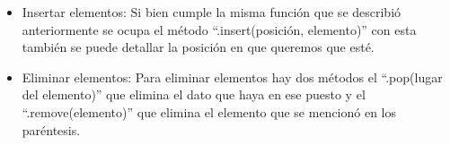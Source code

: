 \begin{itemize}
    \item Insertar elementos: Si bien cumple la misma función que se describió anteriormente se ocupa el método ``.insert(posición, elemento)'' con esta también se puede detallar la posición en que queremos que esté.
    \begin{figure}[h]
        \centering
      \end{figure}
    
    \item Eliminar elementos: Para eliminar elementos hay dos métodos el ``.pop(lugar del elemento)'' que elimina el dato que haya en ese puesto y el ``.remove(elemento)'' que elimina el elemento que se mencionó en los paréntesis.
    \begin{figure}[h]
        \centering
      \end{figure}
    

\end{itemize}
